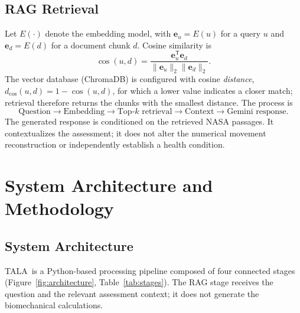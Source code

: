 \documentclass[11pt,a4paper]{article}
\newcommand{\TALA}{\textsc{TALA}}
\begin{document}
\subsection{RAG Retrieval}

Let $E(\cdot)$ denote the embedding model, with $\mathbf{e}_u=E(u)$ for a query $u$ and $\mathbf{e}_d=E(d)$ for a document chunk $d$. Cosine similarity is
\begin{equation}
\cos(u,d)
=
\frac{\mathbf{e}_u^{\mathsf T}\mathbf{e}_d}
{\|\mathbf{e}_u\|_2\|\mathbf{e}_d\|_2}.
\label{eq:cosine}
\end{equation}
The vector database (ChromaDB) is configured with cosine \emph{distance}, $d_{\cos}(u,d)=1-\cos(u,d)$, for which a lower value indicates a closer match; retrieval therefore returns the chunks with the smallest distance. The process is
\begin{equation}
\text{Question}\rightarrow\text{Embedding}\rightarrow\text{Top-}k\text{ retrieval}\rightarrow\text{Context}\rightarrow\text{Gemini response}.
\end{equation}
The generated response is conditioned on the retrieved NASA passages. It contextualizes the assessment; it does not alter the numerical movement reconstruction or independently establish a health condition.

\section{System Architecture and Methodology}

\subsection{System Architecture}

\TALA\ is a Python-based processing pipeline composed of four connected stages (Figure~\ref{fig:architecture}, Table~\ref{tab:stages}). The RAG stage receives the question and the relevant assessment context; it does not generate the biomechanical calculations.
\end{document}
